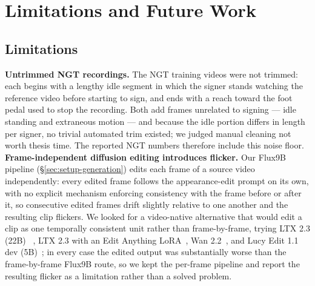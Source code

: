 \chapter{Limitations and Future Work}
\label{sec:limitations}

\section{Limitations}

\textbf{Untrimmed NGT recordings.} The NGT training videos were not
trimmed: each begins with a lengthy idle segment in which the signer
stands watching the reference video before starting to sign, and ends
with a reach toward the foot pedal used to stop the recording. Both add
frames unrelated to signing --- idle standing and extraneous motion ---
and because the idle portion differs in length per signer, no trivial
automated trim existed; we judged manual cleaning not worth thesis time.
The reported NGT numbers therefore include this noise floor.
\textbf{Frame-independent diffusion editing introduces flicker.} Our
Flux9B pipeline (\S\ref{sec:setup-generation}) edits each frame of a
source video independently: every edited frame follows the appearance-edit
prompt on its own, with no explicit mechanism enforcing consistency with
the frame before or after it, so consecutive edited frames drift slightly
relative to one another and the resulting clip flickers. We looked for a
video-native alternative that would edit a clip as one temporally
consistent unit rather than frame-by-frame, trying LTX 2.3 (22B)
~\cite{hacohen2026ltx2}, LTX 2.3 with an Edit Anything
LoRA~\cite{alissonerdx2026editanything}, Wan
2.2~\cite{wan2025}, and Lucy Edit 1.1 dev
(5B)~\cite{decart2025lucyedit};
in every case the edited
output was substantially worse than the frame-by-frame Flux9B route, so we
kept the per-frame pipeline and report the resulting flicker as a
limitation rather than a solved problem.

